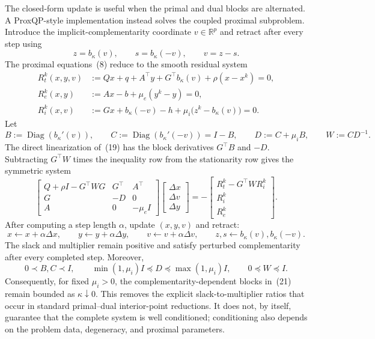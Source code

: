 \documentclass[10pt]{article}
\newcommand{\R}{\mathbb{R}}
\newcommand{\diag}{\operatorname{Diag}}
\begin{document}
The closed-form update is useful when the primal and dual blocks are alternated. A ProxQP-style implementation instead solves the coupled proximal subproblem. Introduce the implicit-complementarity coordinate $v\in\R^p$ and retract after every step using
\begin{equation}
z=b_\kappa(v),
\qquad
s=b_\kappa(-v),
\qquad
v=z-s.
\end{equation}
The proximal equations~(8) reduce to the smooth residual system
\begin{equation}
\begin{aligned}
R_t^k(x,y,v)
&:=Qx+q+A^\top y+G^\top b_\kappa(v)+\rho(x-x^k)=0,\\
R_e^k(x,y)
&:=Ax-b+\mu_e(y^k-y)=0,\\
R_i^k(x,v)
&:=Gx+b_\kappa(-v)-h+\mu_i\bigl(z^k-b_\kappa(v)\bigr)=0.
\end{aligned}
\end{equation}
Let
\begin{equation}
B:=\diag\!\left(b_\kappa'(v)\right),
\qquad
C:=\diag\!\left(b_\kappa'(-v)\right)=I-B,
\qquad
D:=C+\mu_iB,
\qquad
W:=CD^{-1}.
\end{equation}
The direct linearization of~(19) has the block derivatives $G^\top B$ and $-D$. Subtracting $G^\top W$ times the inequality row from the stationarity row gives the symmetric system
\begin{equation}
\boxed{
\begin{bmatrix}
Q+\rho I-G^\top WG&G^\top&A^\top\\
G&-D&0\\
A&0&-\mu_eI
\end{bmatrix}
\begin{bmatrix}
\Delta x\\ \Delta v\\ \Delta y
\end{bmatrix}
=-
\begin{bmatrix}
R_t^k-G^\top W R_i^k\\
R_i^k\\
R_e^k
\end{bmatrix}.}
\end{equation}
After computing a step length $\alpha$, update $(x,y,v)$ and retract:
\begin{equation}
x\leftarrow x+\alpha\Delta x,
\qquad
y\leftarrow y+\alpha\Delta y,
\qquad
v\leftarrow v+\alpha\Delta v,
\qquad
z,s\leftarrow b_\kappa(v),b_\kappa(-v).
\end{equation}
The slack and multiplier remain positive and satisfy perturbed complementarity after every completed step. Moreover,
\begin{equation}
0\prec B,C\prec I,
\qquad
\min(1,\mu_i)I\preceq D\preceq\max(1,\mu_i)I,
\qquad
0\preceq W\preceq I.
\end{equation}
Consequently, for fixed $\mu_i>0$, the complementarity-dependent blocks in~(21) remain bounded as $\kappa\downarrow0$. This removes the explicit slack-to-multiplier ratios that occur in standard primal--dual interior-point reductions. It does not, by itself, guarantee that the complete system is well conditioned; conditioning also depends on the problem data, degeneracy, and proximal parameters.
\end{document}

